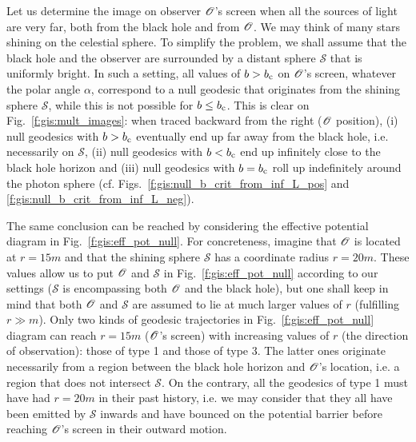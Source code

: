 Let us determine the image on observer $\mathscr{O}$'s screen
when all the sources of light are very far, both
from the black hole and from $\mathscr{O}$. We may think of many stars
shining on the celestial sphere. To simplify the problem, we shall assume
that the black hole and the observer are surrounded by a distant
sphere $\mathscr{S}$ that is uniformly bright. In such a setting,
all values of $b > b_{\rm c}$ on $\mathscr{O}$'s screen, whatever the polar angle $\alpha$,
correspond to a null geodesic that originates from the shining sphere $\mathscr{S}$, while
this is not possible for $b \leq b_{\rm c}$.
This is clear on Fig.~\ref{f:gis:mult_images}: when traced backward from the right
($\mathscr{O}$ position), (i) null geodesics with $b > b_{\rm c}$ eventually end
up far away from the black hole, i.e. necessarily on $\mathscr{S}$, (ii) null geodesics
with $b < b_{\rm c}$ end up infinitely close to the black hole horizon
and (iii) null geodesics with $b = b_{\rm c}$ roll up indefinitely around
the photon sphere (cf. Figs.~\ref{f:gis:null_b_crit_from_inf_L_pos} and
\ref{f:gis:null_b_crit_from_inf_L_neg}).

The same conclusion can be reached
by considering the effective potential diagram in Fig.~\ref{f:gis:eff_pot_null}.
For concreteness, imagine that $\mathscr{O}$ is located at $r=15 m$ and that
the shining sphere $\mathscr{S}$ has a coordinate radius $r=20 m$.
These values allow us to put $\mathscr{O}$ and $\mathscr{S}$
in Fig.~\ref{f:gis:eff_pot_null} according
to our settings ($\mathscr{S}$ is encompassing both $\mathscr{O}$ and the black
hole), but one shall keep in mind that both $\mathscr{O}$ and $\mathscr{S}$
are assumed to lie at much larger values of $r$ (fulfilling $r\gg m$).
Only two kinds of geodesic
trajectories in Fig.~\ref{f:gis:eff_pot_null} diagram can reach $r = 15m$ ($\mathscr{O}$'s screen) with increasing values
of $r$ (the direction of observation): those of type 1 and those of type 3.
The latter ones originate necessarily from a region between the black hole
horizon and $\mathscr{O}$'s location, i.e. a region that does not intersect $\mathscr{S}$.
On the contrary, all the geodesics of type 1 must have had $r = 20 m$
in their past history, i.e. we may consider that they all have been emitted
by $\mathscr{S}$ inwards and have bounced on the potential barrier before
reaching $\mathscr{O}$'s screen in their outward motion.

